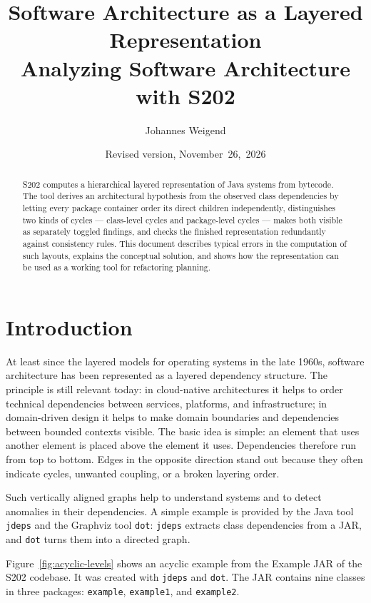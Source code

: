 \documentclass[a4paper,11pt]{article}
\title{Software Architecture as a Layered Representation\\
  \large Analyzing Software Architecture with S202}
\author{Johannes Weigend}
\date{Revised version, November~26,~2026}
\begin{document}
\maketitle

\begin{abstract}
S202 computes a hierarchical layered representation of Java systems from
bytecode. The tool derives an architectural hypothesis from the observed class
dependencies by letting every package container order its direct children
independently, distinguishes two kinds of cycles — class-level cycles and
package-level cycles — makes both visible as separately toggled findings, and
checks the finished representation redundantly against consistency rules. This
document describes typical errors in the computation of such layouts, explains
the conceptual solution, and shows how the representation can be used as a
working tool for refactoring planning.
\end{abstract}

\section{Introduction}

At least since the layered models for operating systems in the late 1960s,
software architecture has been represented as a layered dependency structure.
The principle is still relevant today: in cloud-native architectures it helps
to order technical dependencies between services, platforms, and
infrastructure; in domain-driven design it helps to make domain boundaries and
dependencies between bounded contexts visible. The basic idea is simple: an
element that uses another element is placed above the element it uses.
Dependencies therefore run from top to bottom. Edges in the opposite direction
stand out because they often indicate cycles, unwanted coupling, or a broken
layering order.

Such vertically aligned graphs help to understand systems and to detect
anomalies in their dependencies. A simple example is provided by the Java tool
\texttt{jdeps} and the Graphviz tool \texttt{dot}: \texttt{jdeps} extracts
class dependencies from a JAR, and \texttt{dot} turns them into a directed
graph.

\newpage

Figure~\ref{fig:acyclic-levels} shows an acyclic example from the Example JAR
of the S202 codebase. It was created with \texttt{jdeps} and \texttt{dot}. The
JAR contains nine classes in three packages: \texttt{example},
\texttt{example1}, and \texttt{example2}.
\end{document}
